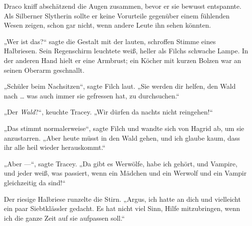 Draco kniff abschätzend die Augen zusammen, bevor er sie bewusst entspannte. Als Silberner Slytherin sollte er keine Vorurteile gegenüber einem fühlenden Wesen zeigen, schon gar nicht, wenn andere Leute ihn sehen könnten.

„Wer ist das?“ sagte die Gestalt mit der lauten, schroffen Stimme eines Halbriesen. Sein Regenschirm leuchtete weiß, heller als Filchs schwache Lampe. In der anderen Hand hielt er eine Armbrust; ein Köcher mit kurzen Bolzen war an seinen Oberarm geschnallt.

„Schüler beim Nachsitzen“, sagte Filch laut.
„Sie werden dir helfen, den Wald nach … was auch immer sie gefressen hat, zu durchsuchen.“

„Der \emph{Wald}?“, keuchte Tracey.
„Wir dürfen da nachts nicht reingehen!“

„Das stimmt normalerweise“, sagte Filch und wandte sich von Hagrid ab, um sie anzustarren.
„Aber heute müsst in den Wald gehen, und ich glaube kaum, dass ihr alle heil wieder herauskommt.“

„Aber —“, sagte Tracey.
„Da gibt es Werwölfe, habe ich gehört, und Vampire, und jeder weiß, was passiert, wenn ein Mädchen und ein Werwolf und ein Vampir gleichzeitig da sind!“

Der riesige Halbriese runzelte die Stirn.
„Argus, ich hatte an dich und vielleicht ein paar Siebtklässler gedacht. Es hat nicht viel Sinn, Hilfe mitzubringen, wenn ich die ganze Zeit auf sie aufpassen soll.“

